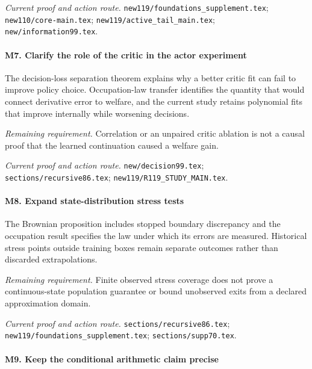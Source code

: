 \par\emph{Current proof and action route.} \nolinkurl{new119/foundations_supplement.tex}; \nolinkurl{new110/core-main.tex}; \nolinkurl{new119/active_tail_main.tex}; \nolinkurl{new/information99.tex}.

\paragraph{M7. Clarify the role of the critic in the actor experiment}

The decision-loss separation theorem explains why a better critic fit can fail to improve policy choice. Occupation-law transfer identifies the quantity that would connect derivative error to welfare, and the current study retains polynomial fits that improve internally while worsening decisions.

\par\emph{Remaining requirement.} Correlation or an unpaired critic ablation is not a causal proof that the learned continuation caused a welfare gain.

\par\emph{Current proof and action route.} \nolinkurl{new/decision99.tex}; \nolinkurl{sections/recursive86.tex}; \nolinkurl{new119/R119_STUDY_MAIN.tex}.

\paragraph{M8. Expand state-distribution stress tests}

The Brownian proposition includes stopped boundary discrepancy and the occupation result specifies the law under which its errors are measured. Historical stress points outside training boxes remain separate outcomes rather than discarded extrapolations.

\par\emph{Remaining requirement.} Finite observed stress coverage does not prove a continuous-state population guarantee or bound unobserved exits from a declared approximation domain.

\par\emph{Current proof and action route.} \nolinkurl{sections/recursive86.tex}; \nolinkurl{new119/foundations_supplement.tex}; \nolinkurl{sections/supp70.tex}.

\paragraph{M9. Keep the conditional arithmetic claim precise}

